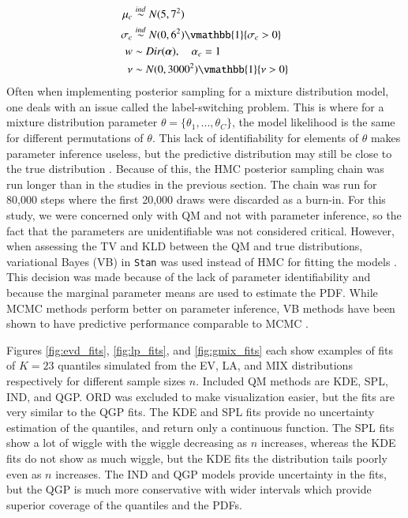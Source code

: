 \documentclass[preprint,12pt,authoryear]{elsarticle}
\begin{document}
    \begin{align*}
        \mu_c &\overset{ind}{\sim} N(5, 7^2) \\
        \sigma_c &\overset{ind}{\sim} N(0, 6^2)\vmathbb{1}\{\sigma_c > 0\} \\ 
        w &\sim Dir(\boldsymbol{\alpha}), \quad \alpha_c = 1 \\
        \nu &\sim N(0, 3000^2)\vmathbb{1}\{\nu > 0\}
    \end{align*}
Often when implementing posterior sampling for a mixture distribution model, one deals with an issue called the label-switching problem. This is where for a mixture distribution parameter $\theta = \{\theta_1,...,\theta_C\}$, the model likelihood is the same for different permutations of $\theta$. This lack of identifiability for elements of $\theta$ makes parameter inference useless, but the predictive distribution may still be close to the true distribution \cite[]{stephens2000dealing}.
Because of this, the HMC posterior sampling chain was run longer than in the studies in the previous section. The chain was run for 80,000 steps where the first 20,000 draws were discarded as a burn-in. For this study, we were concerned only with QM and not with parameter inference, so the fact that the parameters are unidentifiable was not considered critical. However, when assessing the TV and KLD between the QM and true distributions, variational Bayes (VB) in \texttt{Stan} was used instead of HMC for fitting the models \cite[]{kucukelbir2015automatic}. This decision was made because of the lack of parameter identifiability and because the marginal parameter means are used to estimate the PDF. While MCMC methods perform better on parameter inference, VB methods have been shown to have predictive performance comparable to MCMC \cite[]{blei2017variational}.


Figures \ref{fig:evd_fits}, \ref{fig:lp_fits},  and \ref{fig:gmix_fits} each show examples of fits of $K=23$ quantiles simulated from the EV, LA, and MIX distributions respectively for different sample sizes $n$. Included QM methods are KDE, SPL, IND, and QGP. ORD was excluded to make visualization easier, but the fits are very similar to the QGP fits. The KDE and SPL fits provide no uncertainty estimation of the quantiles, and return only a continuous function. The SPL fits show a lot of wiggle with the wiggle decreasing as $n$ increases, whereas the KDE fits do not show as much wiggle, but the KDE fits the distribution tails poorly even as $n$ increases. The IND and QGP models provide uncertainty in the fits, but the QGP is much more conservative with wider intervals which provide superior coverage of the quantiles and the PDFs. 
\end{document}
